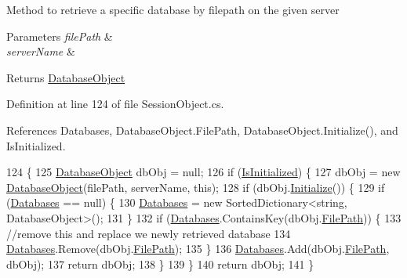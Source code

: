 Method to retrieve a specific database by filepath on the given server 


\begin{DoxyParams}{Parameters}
{\em file\+Path} & \\
\hline
{\em server\+Name} & \\
\hline
\end{DoxyParams}
\begin{DoxyReturn}{Returns}
\mbox{\hyperlink{class_database_object}{Database\+Object}}
\end{DoxyReturn}


Definition at line 124 of file Session\+Object.\+cs.



References Databases, Database\+Object.\+File\+Path, Database\+Object.\+Initialize(), and Is\+Initialized.


\begin{DoxyCode}
124                                                                           \{
125         \mbox{\hyperlink{class_database_object}{DatabaseObject}} dbObj = null;
126         \textcolor{keywordflow}{if} (\mbox{\hyperlink{class_session_object_ae0885b9054fc3ce287307ac16ff69990}{IsInitialized}}) \{
127             dbObj = \textcolor{keyword}{new} \mbox{\hyperlink{class_database_object}{DatabaseObject}}(filePath, serverName, \textcolor{keyword}{this});
128             \textcolor{keywordflow}{if} (dbObj.\mbox{\hyperlink{class_database_object_a7de43a21bd287deec537cffec343f41d}{Initialize}}()) \{
129                 \textcolor{keywordflow}{if} (\mbox{\hyperlink{class_session_object_aa0b75f5b9d0a6325f436e08db27204a2}{Databases}} == null) \{
130                     \mbox{\hyperlink{class_session_object_aa0b75f5b9d0a6325f436e08db27204a2}{Databases}} = \textcolor{keyword}{new} SortedDictionary<string, DatabaseObject>();
131                 \}
132                 \textcolor{keywordflow}{if} (\mbox{\hyperlink{class_session_object_aa0b75f5b9d0a6325f436e08db27204a2}{Databases}}.ContainsKey(dbObj.\mbox{\hyperlink{class_database_object_a38a1a78430c6cd1fc4eef054e39145ce}{FilePath}})) \{
133                     \textcolor{comment}{//remove this and replace we newly retrieved database}
134                     \mbox{\hyperlink{class_session_object_aa0b75f5b9d0a6325f436e08db27204a2}{Databases}}.Remove(dbObj.\mbox{\hyperlink{class_database_object_a38a1a78430c6cd1fc4eef054e39145ce}{FilePath}});
135                 \}
136                 \mbox{\hyperlink{class_session_object_aa0b75f5b9d0a6325f436e08db27204a2}{Databases}}.Add(dbObj.\mbox{\hyperlink{class_database_object_a38a1a78430c6cd1fc4eef054e39145ce}{FilePath}}, dbObj);
137                 \textcolor{keywordflow}{return} dbObj;
138             \}
139         \}
140         \textcolor{keywordflow}{return} dbObj;
141     \}
\end{DoxyCode}
\mbox{\label{class_session_object_ae53bad1d2fe161060ae409024b3e0de4}} 

